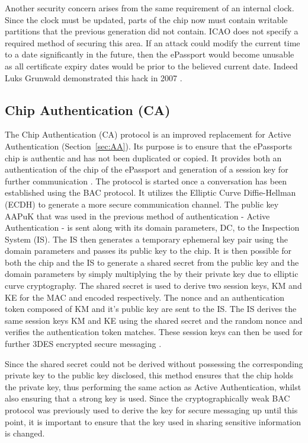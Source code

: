 \documentclass[12pt]{article}
\begin{document}
Another security concern arises from the same requirement of an internal clock. Since the clock must be updated, parts of the chip now must contain writable partitions that the previous generation did not contain. ICAO does not specify a required method of securing this area. If an attack could modify the current time to a date significantly in the future, then the ePassport would become unusable as all certificate expiry dates would be prior to the believed current date. Indeed Luks Grunwald demonstrated this hack in 2007 \cite{SecuritybyPolitics:2007uh}.


\subsection{Chip Authentication (CA)}
\label{sec:CA}
The Chip Authentication (CA) protocol is an improved replacement for Active Authentication (Section~\ref{sec:AA}). Its purpose is to ensure that the ePassports chip is authentic and has not been duplicated or copied. It provides both an authentication of the chip of the ePassport and generation of a session key for further communication \cite{Pasupathinathan:2008vy}.
The protocol is started once a conversation has been established using the BAC protocol. It utilizes the Elliptic Curve Diffie-Hellman (ECDH) \cite{Menezes:1993ua} to generate a more secure communication channel. 
The public key AAPuK that was used in the previous method of authentication - Active Authentication - is sent along with its domain parameters, DC, to the Inspection System (IS). The IS then generates a temporary ephemeral key pair using the domain parameters and passes its public key to the chip. It is then possible for both the chip and the IS to generate a shared secret from the public key and the domain parameters by simply multiplying the by their private key due to elliptic curve cryptography. 
The shared secret is used to derive two session keys, KM and KE for the MAC and encoded respectively. The nonce and an authentication token composed of KM and it's public key are sent to the IS. The IS derives the same session keys KM and KE using the shared secret and the random nonce and verifies the authentication token matches. These session keys can then be used for further 3DES encrypted secure messaging \cite{derInformationstechnik:2012ta}.

Since the shared secret could not be derived without possessing the corresponding private key to the public key disclosed, this method ensures that the chip holds the private key, thus performing the same action as Active Authentication, whilst also ensuring that a strong key is used. Since the cryptographically weak BAC protocol was previously used to derive the key for secure messaging up until this point, it is important to ensure that the key used in sharing sensitive information is changed.
\end{document}
